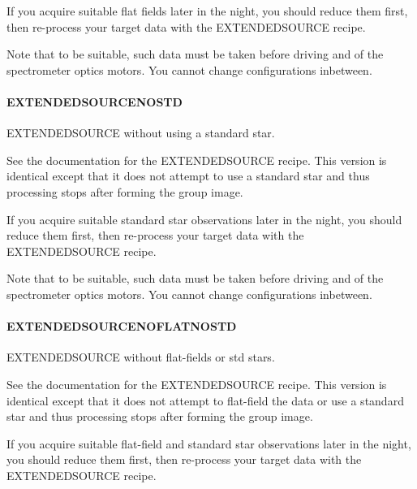 \documentclass[twoside,11pt]{article}
\renewcommand{\_}{\texttt{\symbol{95}}}
\begin{document}
If you acquire suitable flat fields later in the night, you should
reduce them first, then re-process your target data with the
EXTENDED\_SOURCE recipe.



Note that to be suitable, such data must be taken before driving and
of the spectrometer optics motors. You cannot change configurations
inbetween.

\paragraph{EXTENDED\_SOURCE\_NOSTD\label{EXTENDED_SOURCE_NOSTD}}

EXTENDED\_SOURCE without using a standard star.


\mbox{}

See the documentation for the EXTENDED\_SOURCE recipe. This version is
identical except that it does not attempt to use a standard star and
thus processing stops after forming the group image.



If you acquire suitable standard star observations later in the night,
you should reduce them first, then re-process your target data with
the EXTENDED\_SOURCE recipe.



Note that to be suitable, such data must be taken before driving and
of the spectrometer optics motors. You cannot change configurations
inbetween.

\paragraph{EXTENDED\_SOURCE\_NOFLAT\_NOSTD\label{EXTENDED_SOURCE_NOFLAT_NOSTD}}

EXTENDED\_SOURCE without flat-fields or std stars.


\mbox{}

See the documentation for the EXTENDED\_SOURCE recipe. This version is
identical except that it does not attempt to flat-field the data or
use a standard star and thus processing stops after forming the group
image.



If you acquire suitable flat-field and standard star observations later
in the night, you should reduce them first, then re-process your
target data with the EXTENDED\_SOURCE recipe.
\end{document}
